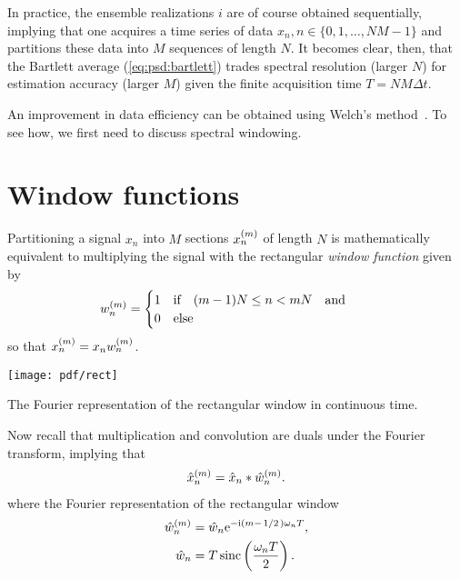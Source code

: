 In practice, the ensemble realizations $i$ are of course obtained sequentially, implying that one acquires a time series of data $x_n, n\in\lbrace0, 1, \dotsc, NM - 1\rbrace$ and partitions these data into $M$ sequences of length $N$.
It becomes clear, then, that the Bartlett average (\cref{eq:psd:bartlett}) trades spectral resolution (larger $N$) for estimation accuracy (larger $M$) given the finite acquisition time $T = NM\Delta t$.

An improvement in data efficiency can be obtained using Welch's method~\cite{Welch1967}.
To see how, we first need to discuss spectral windowing.

\section{Window functions}\label{sec:speck:theory:windows}
Partitioning a signal $x_n$ into $M$ sections $x_n^{(m)}$ of length $N$ is mathematically equivalent to multiplying the signal with the rectangular \emph{window function} given by
\begin{align}\label{eq:window:boxcar}
    w_n\gth{m} =
    \begin{cases}
        1\qif (m - 1) N \leq n < m N\qand \\
        0\qelse
    \end{cases}
\end{align}
so that $x_n^{(m)} = x_n w_n^{(m)}$.
\begin{marginfigure}
    \centering
    \texttt{[image: pdf/rect]}
    \caption{The Fourier representation of the rectangular window in continuous time.}
    \label{fig:boxcar_fourier}
\end{marginfigure}
Now recall that multiplication and convolution are duals under the Fourier transform, implying that
\begin{align}\label{eq:window:ft_pairs}
    \hat{x}_n^{(m)} = \hat{x}_n \ast \hat{w}_n^{(m)}.
\end{align}
where the Fourier representation of the rectangular window
\begin{align}
    \hat{w}_n\gth{m} &= \hat{w}_n \e^{-\i(m - \flatfrac{1}{2})\omega_n T}, \label{eq:window:boxcar:fourier}\\
             \hat{w}_n &= T\sinc\left(\frac{\omega_n T}{2}\right). \label{eq:window:boxcar:fourier:unshifted}
\end{align}
